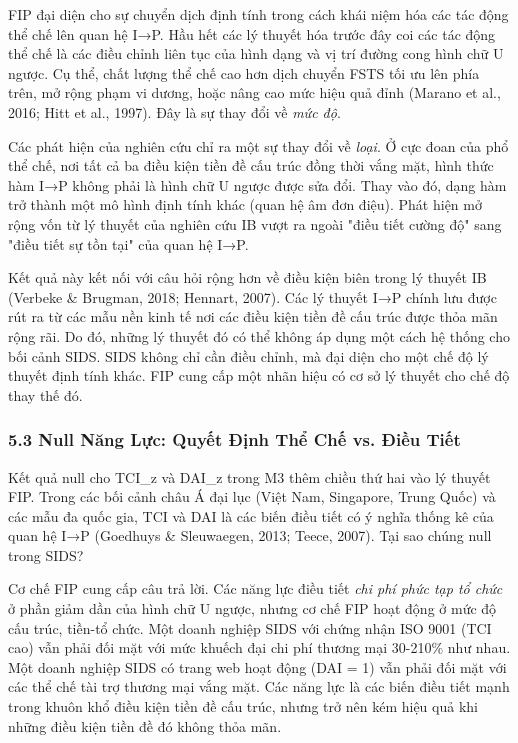\documentclass[12pt,a4paper]{article}
\begin{document}
FIP đại diện cho sự chuyển dịch định tính trong cách khái niệm hóa các
tác động thể chế lên quan hệ I→P. Hầu hết các lý thuyết hóa trước đây
coi các tác động thể chế là các điều chỉnh liên tục của hình dạng và vị
trí đường cong hình chữ U ngược. Cụ thể, chất lượng thể chế cao hơn dịch
chuyển FSTS tối ưu lên phía trên, mở rộng phạm vi dương, hoặc nâng cao
mức hiệu quả đỉnh (Marano et al., 2016; Hitt et al., 1997). Đây là sự
thay đổi về \emph{mức độ}.

Các phát hiện của nghiên cứu chỉ ra một sự thay đổi về \emph{loại}. Ở
cực đoan của phổ thể chế, nơi tất cả ba điều kiện tiền đề cấu trúc đồng
thời vắng mặt, hình thức hàm I→P không phải là hình chữ U ngược được sửa
đổi. Thay vào đó, dạng hàm trở thành một mô hình định tính khác (quan hệ
âm đơn điệu). Phát hiện mở rộng vốn từ lý thuyết của nghiên cứu IB vượt
ra ngoài "điều tiết cường độ" sang "điều tiết sự tồn tại" của quan hệ
I→P.

Kết quả này kết nối với câu hỏi rộng hơn về điều kiện biên trong lý
thuyết IB (Verbeke \& Brugman, 2018; Hennart, 2007). Các lý thuyết I→P
chính lưu được rút ra từ các mẫu nền kinh tế nơi các điều kiện tiền đề
cấu trúc được thỏa mãn rộng rãi. Do đó, những lý thuyết đó có thể không
áp dụng một cách hệ thống cho bối cảnh SIDS. SIDS không chỉ cần điều
chỉnh, mà đại diện cho một chế độ lý thuyết định tính khác. FIP cung cấp
một nhãn hiệu có cơ sở lý thuyết cho chế độ thay thế đó.

\hypertarget{53-null-nux103ng-lux1ef1c-quyux1ebft-ux111ux1ecbnh-thux1ec3-chux1ebf-vs-ux111iux1ec1u-tiux1ebft}{%
\subsubsection{5.3 Null Năng Lực: Quyết Định Thể Chế vs. Điều
Tiết}\label{53-null-nux103ng-lux1ef1c-quyux1ebft-ux111ux1ecbnh-thux1ec3-chux1ebf-vs-ux111iux1ec1u-tiux1ebft}}

Kết quả null cho TCI\_z và DAI\_z trong M3 thêm chiều thứ hai vào lý
thuyết FIP. Trong các bối cảnh châu Á đại lục (Việt Nam, Singapore,
Trung Quốc) và các mẫu đa quốc gia, TCI và DAI là các biến điều tiết có
ý nghĩa thống kê của quan hệ I→P (Goedhuys \& Sleuwaegen, 2013; Teece,
2007). Tại sao chúng null trong SIDS?

Cơ chế FIP cung cấp câu trả lời. Các năng lực điều tiết \emph{chi phí
phức tạp tổ chức} ở phần giảm dần của hình chữ U ngược, nhưng cơ chế FIP
hoạt động ở mức độ cấu trúc, tiền-tổ chức. Một doanh nghiệp SIDS với
chứng nhận ISO 9001 (TCI cao) vẫn phải đối mặt với mức khuếch đại chi
phí thương mại 30-210\% như nhau. Một doanh nghiệp SIDS có trang web
hoạt động (DAI = 1) vẫn phải đối mặt với các thể chế tài trợ thương mại
vắng mặt. Các năng lực là các biến điều tiết mạnh trong khuôn khổ điều
kiện tiền đề cấu trúc, nhưng trở nên kém hiệu quả khi những điều kiện
tiền đề đó không thỏa mãn.
\end{document}
